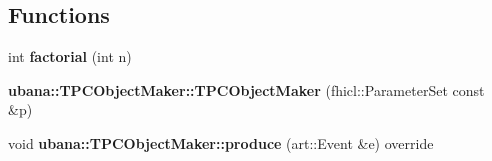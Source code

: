 \subsection*{Functions}
\begin{DoxyCompactItemize}
\item 
\hypertarget{group__UBXSec_gae1b37c26bb8e5744f5747d6cd6505356}{int {\bfseries factorial} (int n)}\label{group__UBXSec_gae1b37c26bb8e5744f5747d6cd6505356}

\item 
\hypertarget{group__UBXSec_gae030804e6aa4085bef6be52e9618fee9}{{\bfseries ubana\-::\-T\-P\-C\-Object\-Maker\-::\-T\-P\-C\-Object\-Maker} (fhicl\-::\-Parameter\-Set const \&p)}\label{group__UBXSec_gae030804e6aa4085bef6be52e9618fee9}

\item 
\hypertarget{group__UBXSec_ga07c03a811bbaccdbeb20b2b7714034c9}{void {\bfseries ubana\-::\-T\-P\-C\-Object\-Maker\-::produce} (art\-::\-Event \&e) override}\label{group__UBXSec_ga07c03a811bbaccdbeb20b2b7714034c9}


\end{DoxyCompactItemize}
